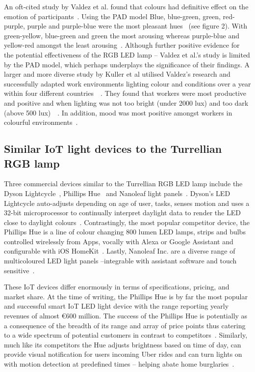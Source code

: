 \documentclass{sigchi}
\begin{document}
An oft-cited study by Valdez et al. found that colours had definitive effect on the emotion of participants~\cite{valdez1994effects}. Using the PAD model Blue, blue-green, green, red-purple, purple and purple-blue were the most pleasant hues~\cite{valdez1994effects} (see figure 2). With green-yellow, blue-green and green the most arousing whereas purple-blue and yellow-red amongst the least arousing~\cite{valdez1994effects}. Although further positive evidence for the potential effectiveness of the RGB LED lamp – Valdez et al.’s study is limited by the PAD model, which perhaps underplays the significance of their findings. A larger and more diverse study by Kuller et al utilised Valdez’s research and successfully adapted work environments lighting colour and conditions over a year within four different countries~\cite{kuller2006impact}~\cite{kuller2009color}. They found that workers were most productive and positive and when lighting was not too bright (under 2000 lux) and too dark (above 500 lux)~\cite{kuller2006impact}~\cite{kuller2009color}. In addition, mood was most positive amongst workers in colourful environments~\cite{kuller1986physiological}.

\subsection{Similar IoT light devices to the Turrellian RGB lamp}

Three commercial devices similar to the Turrellian RGB LED lamp include the Dyson Lightcycle~\cite{Dyson01}, Phillips Hue~\cite{Phillips01} and Nanoleaf light panels~\cite{Nanoleaf01}. Dyson’s LED Lightcycle auto-adjusts depending on age of user, tasks, senses motion and uses a 32-bit microprocessor to continually interpret daylight data to render the LED close to daylight colours~\cite{Dyson01}. Contrastingly, the most popular competitor device, the Phillips Hue is a line of colour changing 800 lumen LED lamps, strips and bulbs controlled wirelessly from Apps, vocally with Alexa or Google Assistant and configurable with iOS HomeKit~\cite{Phillips01}. Lastly, Nanoleaf Inc. are a diverse range of multicoloured LED light panels –integrable with assistant software and touch sensitive~\cite{Nanoleaf01}. 

These IoT devices differ enormously in terms of specifications, pricing, and market share. At the time of writing, the Phillips Hue is by far the most popular and successful smart IoT LED light device with the range reporting yearly revenues of almost €600 million. The success of the Phillips Hue is potentially as a consequence of the breadth of its range and array of price points thus catering to a wide spectrum of potential customers in contrast to competitors~\cite{Phillips01}. Similarly, much like its competitors the Hue adjusts brightness based on time of day, can provide visual notification for users incoming Uber rides and can turn lights on with motion detection at predefined times – helping abate home burglaries~\cite{Phillips01}. 
\end{document}
